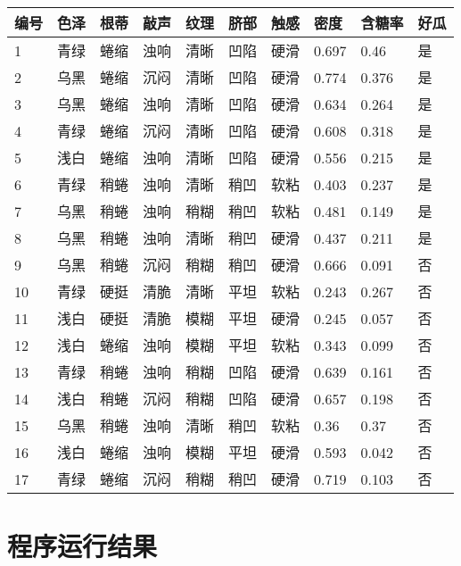 \documentclass{article}
\begin{document}
\begin{table}[!ht]
    \centering
    \begin{tabular}{|l|l|l|l|l|l|l|l|l|l|}
    \hline
        编号 & 色泽 & 根蒂 & 敲声 & 纹理 & 脐部 & 触感 & 密度 & 含糖率 & 好瓜 \\ \hline
        1 & 青绿 & 蜷缩 & 浊响 & 清晰 & 凹陷 & 硬滑 & 0.697 & 0.46 & 是 \\ \hline
        2 & 乌黑 & 蜷缩 & 沉闷 & 清晰 & 凹陷 & 硬滑 & 0.774 & 0.376 & 是 \\ \hline
        3 & 乌黑 & 蜷缩 & 浊响 & 清晰 & 凹陷 & 硬滑 & 0.634 & 0.264 & 是 \\ \hline
        4 & 青绿 & 蜷缩 & 沉闷 & 清晰 & 凹陷 & 硬滑 & 0.608 & 0.318 & 是 \\ \hline
        5 & 浅白 & 蜷缩 & 浊响 & 清晰 & 凹陷 & 硬滑 & 0.556 & 0.215 & 是 \\ \hline
        6 & 青绿 & 稍蜷 & 浊响 & 清晰 & 稍凹 & 软粘 & 0.403 & 0.237 & 是 \\ \hline
        7 & 乌黑 & 稍蜷 & 浊响 & 稍糊 & 稍凹 & 软粘 & 0.481 & 0.149 & 是 \\ \hline
        8 & 乌黑 & 稍蜷 & 浊响 & 清晰 & 稍凹 & 硬滑 & 0.437 & 0.211 & 是 \\ \hline
        9 & 乌黑 & 稍蜷 & 沉闷 & 稍糊 & 稍凹 & 硬滑 & 0.666 & 0.091 & 否 \\ \hline
        10 & 青绿 & 硬挺 & 清脆 & 清晰 & 平坦 & 软粘 & 0.243 & 0.267 & 否 \\ \hline
        11 & 浅白 & 硬挺 & 清脆 & 模糊 & 平坦 & 硬滑 & 0.245 & 0.057 & 否 \\ \hline
        12 & 浅白 & 蜷缩 & 浊响 & 模糊 & 平坦 & 软粘 & 0.343 & 0.099 & 否 \\ \hline
        13 & 青绿 & 稍蜷 & 浊响 & 稍糊 & 凹陷 & 硬滑 & 0.639 & 0.161 & 否 \\ \hline
        14 & 浅白 & 稍蜷 & 沉闷 & 稍糊 & 凹陷 & 硬滑 & 0.657 & 0.198 & 否 \\ \hline
        15 & 乌黑 & 稍蜷 & 浊响 & 清晰 & 稍凹 & 软粘 & 0.36 & 0.37 & 否 \\ \hline
        16 & 浅白 & 蜷缩 & 浊响 & 模糊 & 平坦 & 硬滑 & 0.593 & 0.042 & 否 \\ \hline
        17 & 青绿 & 蜷缩 & 沉闷 & 稍糊 & 稍凹 & 硬滑 & 0.719 & 0.103 & 否 \\ \hline
    \end{tabular}
\end{table}

\section{程序运行结果}

\end{document}
